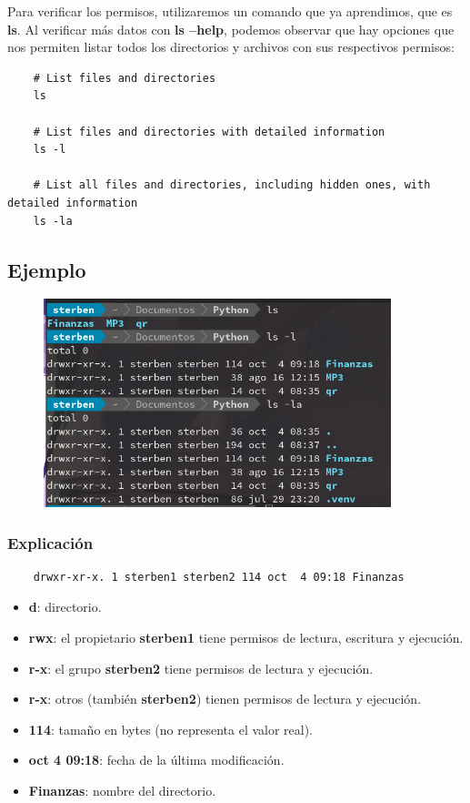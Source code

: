 Para verificar los permisos, utilizaremos un comando que ya aprendimos, que es \textbf{ls}. Al verificar más datos con \textbf{ls --help}, podemos observar que hay opciones que nos permiten listar todos los directorios y archivos con sus respectivos permisos:

\begin{lstlisting}
    # List files and directories
    ls

    # List files and directories with detailed information 
    ls -l     

    # List all files and directories, including hidden ones, with detailed information
    ls -la
\end{lstlisting}

\subsection*{Ejemplo}
\begin{figure}[h!]
    \centering
    \includegraphics[width=0.9\textwidth]{img/permisos.png}
\end{figure}

\subsubsection*{Explicación}
\begin{lstlisting}
    drwxr-xr-x. 1 sterben1 sterben2 114 oct  4 09:18 Finanzas
\end{lstlisting}

\begin{itemize}
    \item \textbf{d}: directorio.
    \item \textbf{rwx}: el propietario \textbf{sterben1} tiene permisos de lectura, escritura y ejecución.
    \item \textbf{r-x}: el grupo \textbf{sterben2} tiene permisos de lectura y ejecución.
    \item \textbf{r-x}: otros (también \textbf{sterben2}) tienen permisos de lectura y ejecución.
    \item \textbf{114}: tamaño en bytes (no representa el valor real).
    \item \textbf{oct 4 09:18}: fecha de la última modificación.
    \item \textbf{Finanzas}: nombre del directorio.
\end{itemize}

